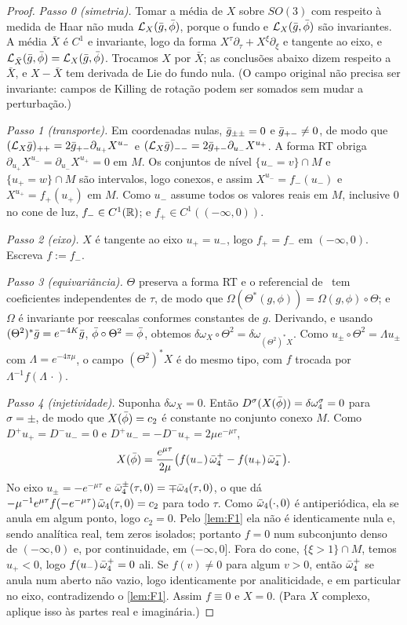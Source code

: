 \begin{proof}
\emph{Passo 0 (simetria).} Tomar a média de $X$ sobre $SO(3)$ com respeito à medida de Haar não muda
$\mathcal{L}_X(\bar g,\bar\phi)$, porque o fundo e $\mathcal{L}_X(\bar g,\bar\phi)$ são invariantes. A média $\bar X$ é
$C^1$ e invariante, logo da forma $X^\tau\partial_\tau+X^\xi\partial_\xi$ e tangente ao eixo, e
$\mathcal{L}_{\bar X}(\bar g,\bar\phi)=\mathcal{L}_X(\bar g,\bar\phi)$. Trocamos $X$ por $\bar X$; as conclusões abaixo dizem respeito a
$\bar X$, e $X-\bar X$ tem derivada de Lie do fundo nula. (O campo original não precisa ser
invariante: campos de Killing de rotação podem ser somados sem mudar a perturbação.)

\emph{Passo 1 (transporte).} Em coordenadas nulas, $\bar g_{\pm\pm}=0$ e $\bar g_{+-}\neq0$, de modo que
$(\mathcal{L}_X\bar g)_{++}=2\bar g_{+-}\partial_{u_+}X^{u_-}$ e $(\mathcal{L}_X\bar g)_{--}=2\bar g_{+-}\partial_{u_-}X^{u_+}$.
A forma RT obriga $\partial_{u_+}X^{u_-}=\partial_{u_-}X^{u_+}=0$ em $M$. Os conjuntos de nível
$\{u_-=v\}\cap M$ e $\{u_+=w\}\cap M$ são intervalos, logo conexos, e assim $X^{u_-}=f_-(u_-)$ e
$X^{u_+}=f_+(u_+)$ em $M$. Como $u_-$ assume todos os valores reais em $M$, inclusive $0$ no cone de luz,
$f_-\in C^1(\mathbb{R})$; e $f_+\in C^1((-\infty,0))$.

\emph{Passo 2 (eixo).} $X$ é tangente ao eixo $u_+=u_-$, logo $f_+=f_-$ em $(-\infty,0)$. Escreva $f:=f_-$.

\emph{Passo 3 (equivariância).} $\Theta$ preserva a forma RT e o referencial de~\cite{RT2019} tem coeficientes
independentes de $\tau$, de modo que $\Omega(\Theta^*(g,\phi))=\Omega(g,\phi)\circ\Theta$; e $\Omega$ é invariante por
reescalas conformes constantes de $g$. Derivando, e usando $(\Theta^2)^*\bar g=e^{-4K}\bar g$,
$\bar\phi\circ\Theta^2=\bar\phi$, obtemos $\delta\omega_X\circ\Theta^2=\delta\omega_{(\Theta^2)^*X}$. Como
$u_\pm\circ\Theta^2=\Lambda u_\pm$ com $\Lambda=e^{-4\pi\mu}$, o campo $(\Theta^2)^*X$ é do mesmo tipo,
com $f$ trocada por $\Lambda^{-1}f(\Lambda\,\cdot)$.

\emph{Passo 4 (injetividade).} Suponha $\delta\omega_X=0$. Então $D^\sigma(X(\bar\phi))=\delta\omega_4^\sigma=0$
para $\sigma=\pm$, de modo que $X(\bar\phi)=c_2$ é constante no conjunto conexo $M$. Como $D^+u_+=D^-u_-=0$ e
$D^+u_-=-D^-u_+=2\mu e^{-\mu\tau}$,
\[
  X(\bar\phi)=\frac{e^{\mu\tau}}{2\mu}\big(f(u_-)\,\bar\omega_4^+-f(u_+)\,\bar\omega_4^-\big).
\]
No eixo $u_\pm=-e^{-\mu\tau}$ e $\bar\omega_4^\pm(\tau,0)=\mp\bar\omega_4(\tau,0)$, o que dá
$-\mu^{-1}e^{\mu\tau}f(-e^{-\mu\tau})\,\bar\omega_4(\tau,0)=c_2$ para todo $\tau$. Como $\bar\omega_4(\cdot,0)$ é
antiperiódica, ela se anula em algum ponto, logo $c_2=0$. Pelo \cref{lem:F1} ela não é identicamente nula e,
sendo analítica real, tem zeros isolados; portanto $f=0$ num subconjunto denso de $(-\infty,0)$ e, por continuidade, em
$(-\infty,0]$. Fora do cone, $\{\xi>1\}\cap M$, temos $u_+<0$, logo $f(u_-)\,\bar\omega_4^+=0$ ali. Se
$f(v)\neq0$ para algum $v>0$, então $\bar\omega_4^+$ se anula num aberto não vazio, logo identicamente por
analiticidade, e em particular no eixo, contradizendo o \cref{lem:F1}. Assim $f\equiv0$ e $X=0$. (Para
$X$ complexo, aplique isso às partes real e imaginária.)


\end{proof}
